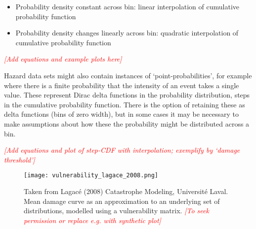 \documentclass{article}
\begin{document}
\begin{itemize}
    \item Probability density constant across bin: linear interpolation of cumulative probability function
    \item Probability density changes linearly across bin: quadratic interpolation of cumulative probability function
\end{itemize}

{\textcolor{red}{\emph{[Add equations and example plots here]}}}

Hazard data sets might also contain instances of `point-probabilities', for example where there is a finite probability that the intensity of an event takes a single value. These represent Dirac delta functions in the probability distribution, steps in the cumulative probability function. There is the option of retaining these as delta functions (bins of zero width), but in some cases it may be necessary to make assumptions about how these the probability might be distributed across a bin.

{\textcolor{red}{\emph{[Add equations and plot of step-CDF with interpolation; exemplify by `damage threshold']}}}

\begin{figure}[ht]

    \begin{framed}

    \texttt{[image: vulnerability\_lagace\_2008.png]}

    \end{framed}

    \footnotesize

    \renewcommand{\arraystretch}{1.01}

    \vspace{-3ex}


    \vspace{-0.5ex}

    \caption{\small Taken from Lagacé (2008) Catastrophe Modeling, Université Laval. Mean damage curve as an approximation to an underlying set of distributions, modelled using a vulnerability matrix. {\textcolor{red}{\emph{[To seek permission or replace e.g. with synthetic plot]}}}}
    \label{Fig:vulnerability_matrix}

\end{figure}
\end{document}

